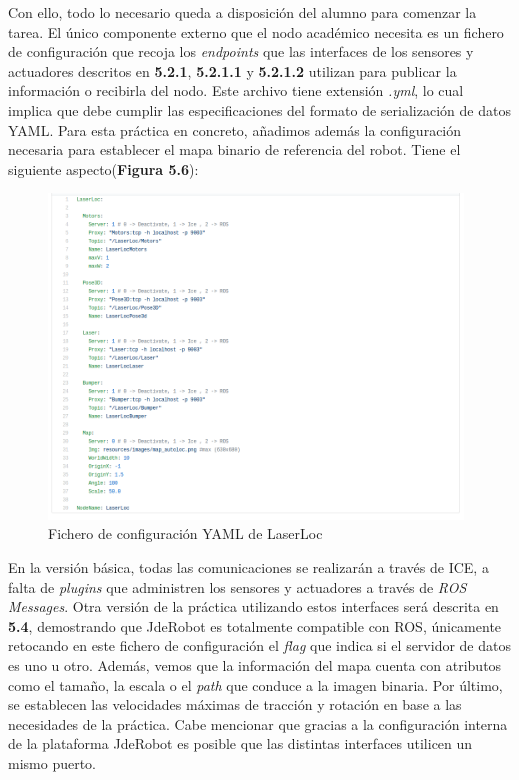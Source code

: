 Con ello, todo lo necesario queda a disposición del alumno para comenzar la tarea. El único componente externo que el nodo académico necesita es un fichero de configuración que recoja los \textit{endpoints} que las interfaces de los sensores y actuadores descritos en \textbf{5.2.1}, \textbf{5.2.1.1} y \textbf{5.2.1.2} utilizan para publicar la información o recibirla del nodo. Este archivo tiene extensión \textit{.yml}, lo cual implica que debe cumplir las especificaciones del formato de serialización de datos YAML. Para esta práctica en concreto, añadimos además la configuración necesaria para establecer el mapa binario de referencia del robot. Tiene el siguiente aspecto(\textbf{Figura 5.6}):

\begin{figure}[H]
  \begin{center}
    \includegraphics[width=0.98\textwidth]{figures/ymlantiguo.png}
		\caption{Fichero de configuración YAML de LaserLoc}
		\label{fig.llyaml}
		\end{center}
\end{figure}

En la versión básica, todas las comunicaciones se realizarán a través de ICE, a falta de \textit{plugins} que administren los sensores y actuadores a través de \textit{ROS Messages}. Otra versión de la práctica utilizando estos interfaces será descrita en \textbf{5.4}, demostrando que JdeRobot es totalmente compatible con ROS, únicamente retocando en este fichero de configuración el \textit{flag} que indica si el servidor de datos es uno u otro. Además, vemos que la información del mapa cuenta con atributos como el tamaño, la escala o el \textit{path} que conduce a la imagen binaria. Por último, se establecen las velocidades máximas de tracción y rotación en base a las necesidades de la práctica. Cabe mencionar que gracias a la configuración interna de la plataforma JdeRobot es posible que las distintas interfaces utilicen un mismo puerto.

